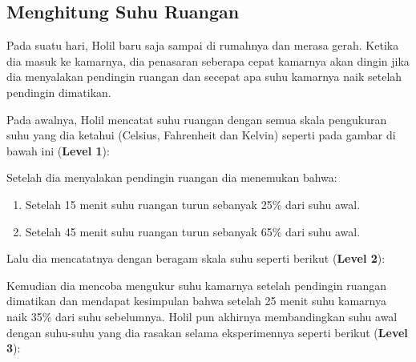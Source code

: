 \documentclass[../main.tex]{subfiles}
\begin{document}
\subsection{Menghitung Suhu Ruangan}

Pada suatu hari, Holil baru saja sampai di rumahnya dan merasa gerah. Ketika dia masuk ke kamarnya, dia penasaran seberapa cepat kamarnya akan dingin jika dia menyalakan pendingin ruangan dan secepat apa suhu kamarnya naik setelah pendingin dimatikan.

Pada awalnya, Holil mencatat suhu ruangan dengan semua skala pengukuran suhu yang dia ketahui (Celsius, Fahrenheit dan Kelvin) seperti pada gambar di bawah ini (\textbf{Level 1}):


Setelah dia menyalakan pendingin ruangan dia menemukan bahwa:
\begin{enumerate}[leftmargin=1.76cm]
    \item Setelah 15 menit suhu ruangan turun sebanyak 25\% dari suhu awal.
    \item Setelah 45 menit suhu ruangan turun sebanyak 65\% dari suhu awal.
\end{enumerate}

Lalu dia mencatatnya dengan beragam skala suhu seperti berikut (\textbf{Level 2}):


Kemudian dia mencoba mengukur suhu kamarnya setelah pendingin ruangan dimatikan dan mendapat kesimpulan bahwa setelah 25 menit suhu kamarnya naik 35\% dari suhu sebelumnya. Holil pun akhirnya membandingkan suhu awal dengan suhu-suhu yang dia rasakan selama eksperimennya seperti berikut (\textbf{Level 3}):

\end{document}
